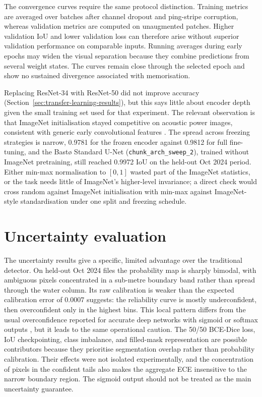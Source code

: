 The convergence curves require the same protocol distinction. Training metrics are averaged over batches after channel dropout and ping-stripe corruption, whereas validation metrics are computed on unaugmented patches. Higher validation IoU and lower validation loss can therefore arise without superior validation performance on comparable inputs. Running averages during early epochs may widen the visual separation because they combine predictions from several weight states. The curves remain close through the selected epoch and show no sustained divergence associated with memorisation.

Replacing ResNet-34 with ResNet-50 did not improve accuracy (Section~\ref{sec:transfer-learning-results}), but this says little about encoder depth given the small training set used for that experiment. The relevant observation is that ImageNet initialisation stayed competitive on acoustic power images, consistent with generic early convolutional features \cite{yosinski_how_2014}. The spread across freezing strategies is narrow, 0.9781 for the frozen encoder against 0.9812 for full fine-tuning, and the Bast\o{} Standard U-Net (\texttt{chunk\_arch\_sweep\_2}), trained without ImageNet pretraining, still reached 0.9972 IoU on the held-out Oct 2024 period. Either min-max normalisation to $[0,1]$ wasted part of the ImageNet statistics, or the task needs little of ImageNet's higher-level invariance; a direct check would cross random against ImageNet initialisation with min-max against ImageNet-style standardisation under one split and freezing schedule.

\section{Uncertainty evaluation}

The uncertainty results give a specific, limited advantage over the traditional detector. On held-out Oct 2024 files the probability map is sharply bimodal, with ambiguous pixels concentrated in a sub-metre boundary band rather than spread through the water column. Its raw calibration is weaker than the expected calibration error of $0.0007$ suggests: the reliability curve is mostly underconfident, then overconfident only in the highest bins. This local pattern differs from the usual overconfidence reported for accurate deep networks with sigmoid or softmax outputs \cite{guo_calibration_2017}, but it leads to the same operational caution. The 50/50 BCE-Dice loss, IoU checkpointing, class imbalance, and filled-mask representation are possible contributors because they prioritise segmentation overlap rather than probability calibration. Their effects were not isolated experimentally, and the concentration of pixels in the confident tails also makes the aggregate ECE insensitive to the narrow boundary region. The sigmoid output should not be treated as the main uncertainty guarantee.

